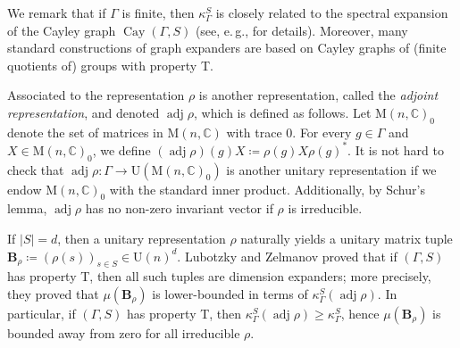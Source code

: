\documentclass[11pt]{article}
\newcommand{\C}{{\mathbb C}}
\newcommand{\eg}{e.\,g.}
\theoremstyle{plain}
\numberwithin{equation}{section}
\theoremstyle{definition}
\DeclareMathOperator\adj{adj}
\newcommand{\ab}[1]{\left\lvert#1\right\rvert}
\newcommand{\M}{\mathrm{M}}
\newcommand{\U}{\mathrm{U}}
\newcommand{\tuple}[1]{\mathbf{#1}}
\newcommand{\vB}{\tuple{B}}
\begin{document}
We remark that if $\Gamma$ is finite, then $\kappa_\Gamma^S$ is closely related to the spectral expansion of the Cayley graph $\operatorname{Cay}(\Gamma,S)$ (see, \eg, \cite{MeshulamWigderson2004} for details). Moreover, many standard constructions of graph expanders are based on Cayley graphs of (finite quotients of) groups with property T.

Associated to the representation $\rho$ is another representation, called the \emph{adjoint representation}, and denoted $\adj \rho$, which is defined as follows. Let $\M(n,\C)_0$ denote the set of matrices in $\M(n,\C)$ with trace $0$. For every $g \in \Gamma$ and $X \in \M(n,\C)_0$, we define $(\adj \rho)(g)X \coloneqq \rho(g)X \rho(g)^*$. It is not hard to check that $\adj \rho:\Gamma \to \U(\M(n,\C)_0)$ is another unitary representation if we endow $\M(n,\C)_0$ with the standard inner product. Additionally, by Schur's lemma, $\adj \rho$ has no non-zero invariant vector if $\rho$ is irreducible.

If $\ab S=d$, then a unitary representation $\rho$ naturally yields a unitary matrix tuple $\vB_\rho\coloneqq (\rho(s))_{s \in S} \in \U(n)^d$. Lubotzky and Zelmanov \cite{LUBOTZKY2008730} proved that if $(\Gamma,S)$ has property T, then all such tuples are dimension expanders; more precisely, they proved that $\mu(\vB_\rho)$ is lower-bounded in terms of $\kappa_\Gamma^S(\adj \rho)$. In particular, if $(\Gamma,S)$ has property T, then $\kappa_\Gamma^S(\adj \rho)\geq \kappa_\Gamma^S$, hence $\mu(\vB_\rho)$ is bounded away from zero for all irreducible $\rho$.
\end{document}

